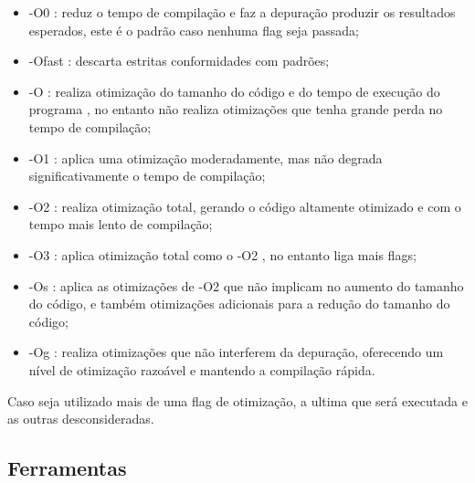\begin{itemize}
	\item -O0 : reduz o tempo de compilação e faz a depuração produzir os
 resultados esperados, este é o padrão caso nenhuma flag seja passada;
    \item -Ofast : descarta estritas conformidades com padrões;
    \item -O  : realiza otimização do tamanho do código e do tempo de execução do programa ,
 no entanto não realiza otimizações que tenha grande perda no tempo de compilação;
    \item -O1 :  aplica uma otimização moderadamente, mas não degrada significativamente
 o tempo de compilação;
    \item -O2 : realiza otimização total, gerando o código altamente otimizado e com o
 tempo mais lento de compilação;
    \item -O3 : aplica otimização total como o -O2 , no entanto liga mais flags;
    \item -Os : aplica as otimizações de -O2 que não implicam no aumento do tamanho do código,
 e também otimizações adicionais para a redução do tamanho do código;
    \item -Og : realiza otimizações  que não interferem da depuração,
 oferecendo um nível de otimização razoável e  mantendo a compilação rápida.
\end{itemize}

Caso seja utilizado mais de uma flag de otimização, a ultima que será executada
 e as outras desconsideradas.


\subsection{Ferramentas}  \label{ferramentas_de_otimizacao}

